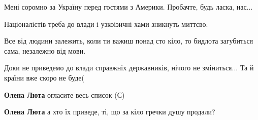 \begin{itemize}
 
Мені соромно за Україну перед гостями з Америки. Пробачте, будь ласка, нас...

 
Націоналістів треба до влади і узкоізичні хами зникнуть миттєво.

 
Все від людини залежить, коли ти важиш понад сто кіло, то бидлота загубиться сама, незалежно від мови.

 
Доки не приведемо до влади справжніх державників, нічого не зміниться... Та й країни вже скоро не буде(

\begin{itemize}
 
\textbf{Олена Люта} огласите весь список (С)

 
\textbf{Олена Люта} а хто їх приведе, ті, що за кіло гречки душу продали?

 

\end{itemize}
\end{itemize}
